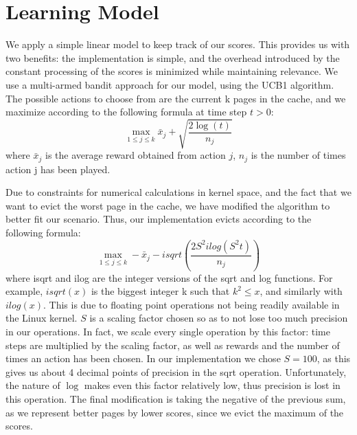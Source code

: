 \section{Learning Model} \label{section:learning}

We apply a simple linear model to keep track of our scores. This provides us with two benefits: the implementation is simple, and the overhead introduced by the constant processing of the scores is minimized while maintaining relevance. We use a multi-armed bandit approach for our model, using the UCB1 algorithm. The possible actions to choose from are the current k pages in the cache, and we maximize according to the following formula at time step $t>0$: $$\max_{1 \leq j \leq k} \bar{x}_{j} + \sqrt{\frac{2\log(t)}{n_{j}}}$$  where $\bar{x}_{j}$ is the average reward obtained from action $j$, $n_{j}$ is the number of times action j has been played.

Due to constraints for numerical calculations in kernel space, and the fact that we want to evict the worst page in the cache, we have modified the algorithm to better fit our scenario. Thus, our implementation evicts according to the following formula:  $$\max_{1 \leq j \leq k} -\bar{x}_{j} - isqrt(\frac{2S^{2}ilog(S^{2}t)}{n_{j}})$$ where isqrt and ilog are the integer versions of the sqrt and log functions. For example, $isqrt(x)$ is the biggest integer k such that $k^{2}\leq x$, and similarly with $ilog(x)$. This is due to floating point operations not being readily available in the Linux kernel. $S$ is a scaling factor chosen so as to not lose too much precision in our operations. In fact, we scale every single operation by this factor: time steps are multiplied by the scaling factor, as well as rewards and the number of times an action has been chosen. In our implementation we chose $S=100$, as this gives us about 4 decimal points of precision in the sqrt operation. Unfortunately, the nature of $\log$ makes even this factor relatively low, thus precision is lost in this operation. The final modification is taking the negative of the previous sum, as we represent better pages by lower scores, since we evict the maximum of the scores.
